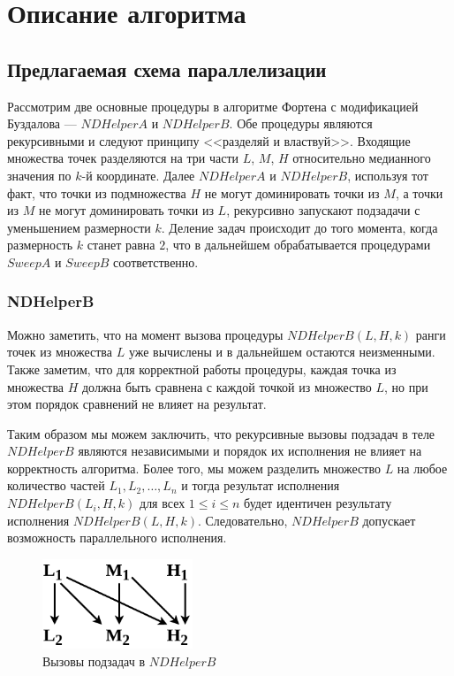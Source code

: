 \chapter{Описание алгоритма}
\section{Предлагаемая схема параллелизации}
Рассмотрим две основные процедуры в алгоритме Фортена с модификацией Буздалова --- $NDHelperA$ и $NDHelperB$.
Обе процедуры являются рекурсивными и следуют принципу <<разделяй и властвуй>>.
Входящие множества точек разделяются на три части $L$, $M$, $H$ относительно медианного значения по $k$-й координате.
Далее $NDHelperA$ и $NDHelperB$, используя тот факт, что точки из подмножества $H$ не могут доминировать точки из $M$, а точки из $M$ не могут доминировать точки из $L$, рекурсивно запускают подзадачи с уменьшением размерности $k$.
Деление задач происходит до того момента, когда размерность $k$ станет равна $2$, что в дальнейшем обрабатывается процедурами $SweepA$ и $SweepB$ соответственно.

\subsection{NDHelperB}
Можно заметить, что на момент вызова процедуры $NDHelperB(L, H, k)$ ранги точек из множества $L$ уже вычислены и в дальнейшем остаются неизменными.
Также заметим, что для корректной работы процедуры, каждая точка из множества $H$ должна быть сравнена с каждой точкой из множество $L$, но при этом порядок сравнений не влияет на результат.

Таким образом мы можем заключить, что рекурсивные вызовы подзадач в теле $NDHelperB$ являются независимыми и порядок их исполнения не влияет на корректность алгоритма.
Более того, мы можем разделить множество $L$ на любое количество частей ${L_1, L_2,\ldots, L_n}$ и тогда результат исполнения $NDHelperB(L_i, H, k)$ для всех $1\leq i\leq n$ будет идентичен результату исполнения $NDHelperB(L, H, k)$.
Следовательно, $NDHelperB$ допускает возможность параллельного исполнения.

\begin{figure}[h]
\centering
\includegraphics[width=0.4\textwidth]{images/ndb.png}
\caption{Вызовы подзадач в $NDHelperB$}
\label{pic4}
\end{figure}

